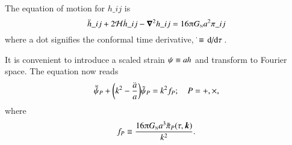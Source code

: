     The equation of motion for $h\_{ij}$ is
    \begin{equation}\label{eq:GR:gws:eom_h}
        \ddot{h}\_{ij} + 2\mathcal{H}\dot{h}\_{ij} - \vec{\nabla}^2 h\_{ij} = 16\ppi G\nped{N} a^2 \pi\_{ij}
    \end{equation}
    where a dot signifies the conformal time derivative, $\dot{}\equiv \dv*{}{\tau}$. %

    It is convenient to introduce a scaled strain $\psi\equiv a h$ and transform to Fourier space. The equation now reads
    \begin{equation}\label{eq:GR:gws:eom_ah_Ft}
        \ddot{\tilde{\psi}}_P + {\left(  k^2 - \frac{\ddot{a}}{a}  \right)} \tilde{\psi}_P = k^2 f_P; 
        \quad P = +, \times,
    \end{equation}
    where
    \begin{equation}\label{eq:GR:gws:Src_P_def}
        f_P \equiv \frac{16\ppi G\nped{N}a^3 \Ft{\pi}_P(\tau, \vec{k})}{k^2}.
    \end{equation}




